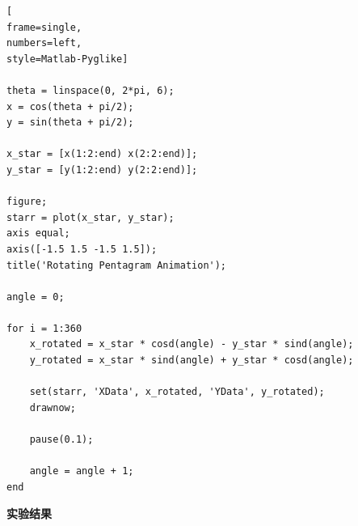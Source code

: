 \documentclass[12pt,UTF8]{ctexart}
\begin{document}
\begin{lstlisting}[
frame=single,
numbers=left,
style=Matlab-Pyglike]

theta = linspace(0, 2*pi, 6);
x = cos(theta + pi/2); 
y = sin(theta + pi/2); 

x_star = [x(1:2:end) x(2:2:end)];
y_star = [y(1:2:end) y(2:2:end)];

figure;
starr = plot(x_star, y_star);
axis equal;
axis([-1.5 1.5 -1.5 1.5]);
title('Rotating Pentagram Animation');

angle = 0;

for i = 1:360
    x_rotated = x_star * cosd(angle) - y_star * sind(angle);
    y_rotated = x_star * sind(angle) + y_star * cosd(angle);
    
    set(starr, 'XData', x_rotated, 'YData', y_rotated);
    drawnow;
    
    pause(0.1);
    
    angle = angle + 1;
end

\end{lstlisting}


\par \textbf{实验结果}
\end{document}
